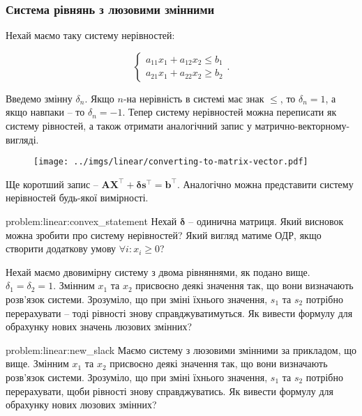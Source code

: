 \documentclass[\main/book.tex]{subfiles}
\begin{document}
\subsubsection{Система рівнянь з люзовими змінними}

Нехай маємо таку систему нерівностей:

\[
 \left\{
  \begin{array}{l}
   a_{11} x_1 + a_{12} x_2 \leq b_1 \\
   a_{21} x_1 + a_{22} x_2 \geq b_2
  \end{array}
 \right. .
\]

Введемо змінну $\delta_n$. Якщо $n$-на нерівність в системі має знак \flqq{}$\leq$\frqq{}, то $\delta_n=1$, а якщо навпаки -- то $\delta_n=-1$. Тепер систему нерівностей можна переписати як систему рівностей, а також отримати аналогічний запис у матрично-векторному-вигляді.

\begin{figure}[!h]
 \center
 \texttt{[image: ../imgs/linear/converting-to-matrix-vector.pdf]}
\end{figure}

Ще коротший запис -- $\mathbf{A} \mathbf{X}^\top + \mathbf{\delta} \mathbf{s}^\top = \mathbf{b}^\top$. Аналогічно можна представити систему нерівностей будь-якої вимірності.

\begin{problem}{problem:linear:convex_statement}
 Нехай $\mathbf{\delta}$ -- одинична матриця. Який висновок можна зробити про систему нерівностей? Який вигляд матиме ОДР, якщо створити додаткову умову $\forall i: x_i \geq 0$?
\end{problem}

\begin{question}
 Нехай маємо двовимірну систему з двома рівняннями, як подано вище. $\delta_1 = \delta_2 = 1$. Змінним $x_1$ та $x_2$ присвоєно деякі значення так, що вони визначають розв'язок системи. Зрозуміло, що при зміні їхнього значення, $s_1$ та $s_2$ потрібно перерахувати -- тоді рівності знову справджуватимуться. Як вивести формулу для обрахунку нових значень люзових змінних?
\end{question}
\begin{problem}{problem:linear:new_slack}
 Маємо систему з люзовими змінними за прикладом, що вище. Змінним $x_1$ та $x_2$ присвоєно деякі значення так, що вони визначають розв'язок системи. Зрозуміло, що при зміні їхнього значення, $s_1$ та $s_2$ потрібно перерахувати, щоби рівності знову справджуватись. Як вивести формулу для обрахунку нових люзових змінних?
\end{problem}
\end{document}
